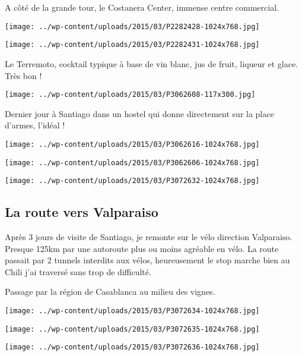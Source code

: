 \pagebreak
A côté de la grande tour, le Costanera Center, immense centre commercial. 
\begin{center} \texttt{[image: ../wp-content/uploads/2015/03/P2282428-1024x768.jpg]} \end{center}
\begin{center} \texttt{[image: ../wp-content/uploads/2015/03/P2282431-1024x768.jpg]} \end{center}

\pagebreak
 Le Terremoto, cocktail typique à base de vin blanc, jus de fruit, liqueur et glace. Très bon ! 
\begin{center} \texttt{[image: ../wp-content/uploads/2015/03/P3062608-117x300.jpg]} \end{center}

 Dernier jour à Santiago dans un hostel qui donne directement sur la place d'armes, l'idéal ! 
\begin{center} \texttt{[image: ../wp-content/uploads/2015/03/P3062616-1024x768.jpg]} \end{center}
\begin{center} \texttt{[image: ../wp-content/uploads/2015/03/P3062606-1024x768.jpg]} \end{center}
\begin{center} \texttt{[image: ../wp-content/uploads/2015/03/P3072632-1024x768.jpg]} \end{center}

\subsection*{La route vers Valparaiso}

 Après 3 jours de visite de Santiago, je remonte sur le vélo direction Valparaiso. Presque 125km par une autoroute plus ou moins agréable en vélo. La route passait par 2 tunnels interdits aux vélos, heureusement le stop marche bien au Chili j'ai traversé sans trop de difficulté. 

 Passage par la région de Casablanca au milieu des vignes. 
\begin{center} \texttt{[image: ../wp-content/uploads/2015/03/P3072634-1024x768.jpg]} \end{center}
\begin{center} \texttt{[image: ../wp-content/uploads/2015/03/P3072635-1024x768.jpg]} \end{center}
\begin{center} \texttt{[image: ../wp-content/uploads/2015/03/P3072636-1024x768.jpg]} \end{center}

